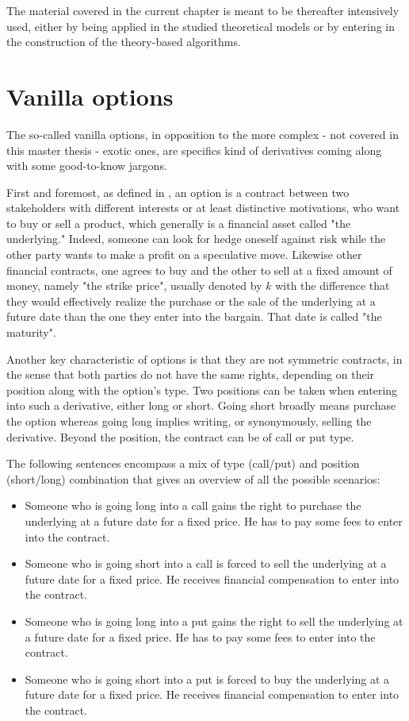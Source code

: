 \documentclass[a4paper, 12pt]{report}
\begin{document}
The material covered in the current chapter is meant to be thereafter intensively used, either by being applied in the studied theoretical models or by entering in the construction of the theory-based algorithms.

\section{Vanilla options}
\label{sec:upstream:vanilla}

The so-called vanilla options, in opposition to the more complex - not covered in this master thesis - exotic ones, are specifics kind of derivatives coming along with some good-to-know jargons. 

First and foremost,  as defined in \citet{hull}, an option is a contract between two stakeholders with different interests or at least distinctive motivations, who want to buy or sell a product, which generally is a financial asset called "the underlying." 
Indeed, someone can look for hedge oneself against risk while the other party wants to make a profit on a speculative move.
Likewise other financial contracts, one agrees to buy and the other to sell at a fixed amount of money, namely "the strike price", usually denoted by $k$ with the difference that they would effectively realize the purchase or the sale of the underlying at a future date than the one they enter into the bargain. That date is called "the maturity".


Another key characteristic of options is that they are not symmetric contracts, in the sense that both parties do not have the same rights, depending on their position along with the option's type. 
Two positions can be taken when entering into such a derivative, either long or short. 
Going short broadly means purchase the option whereas going long implies writing, or synonymously, selling the derivative. Beyond the position, the contract can be of call or put type. 

The following sentences encompass a mix of type (call/put) and position (short/long) combination that gives an overview of all the possible scenarios:

\begin{itemize}
\item Someone who is going long into a call gains the right to purchase the underlying at a future date for a fixed price. He has to pay some fees to enter into the contract.
\item Someone who is going short into a call is forced to sell the underlying at a future date for a fixed price. He receives financial compensation to enter into the contract.
\item Someone who is going long into a put gains the right to sell the underlying at a future date for a fixed price. He has to pay some fees to enter into the contract.
\item Someone who is going short into a put is forced to buy the underlying at a future date for a fixed price. He receives financial compensation to enter into the contract.
\end{itemize}
\end{document}
